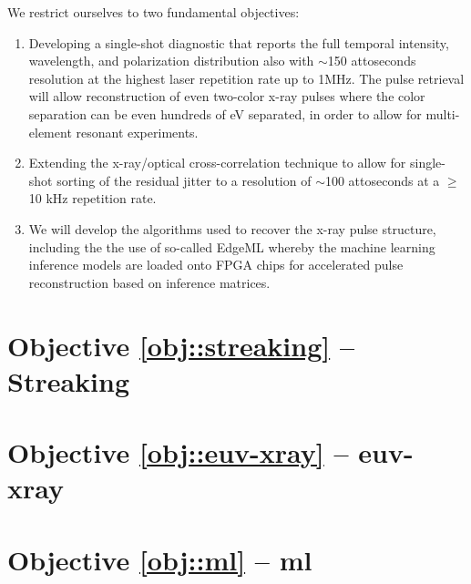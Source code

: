 \documentclass[letterpaper,oneside,11pt]{article}
\begin{document}
We restrict ourselves to two fundamental objectives:
\begin{enumerate}
\item \label{obj::streaking} Developing a single-shot diagnostic that reports the full temporal intensity, wavelength, and polarization distribution also with $\sim$150 attoseconds resolution at the highest laser repetition rate up to 1MHz.  
The pulse retrieval will allow reconstruction of even two-color x-ray pulses where the color separation can be even hundreds of eV separated, in order to allow for multi-element resonant experiments.
\item \label{obj::euv-xray} Extending the x-ray/optical cross-correlation technique to allow for single-shot sorting of the residual jitter to a resolution of $\sim$100 attoseconds at a $\geq$10 kHz repetition rate.
\item \label{obj::ml} We will develop the algorithms used to recover the x-ray pulse structure, including the the use of so-called EdgeML whereby the machine learning inference models are loaded onto FPGA chips for accelerated pulse reconstruction based on inference matrices.
\end{enumerate}



\section*{Objective \ref{obj::streaking} -- Streaking}
\section*{Objective \ref{obj::euv-xray} -- euv-xray}
\section*{Objective \ref{obj::ml} -- ml}


%
\end{document}
